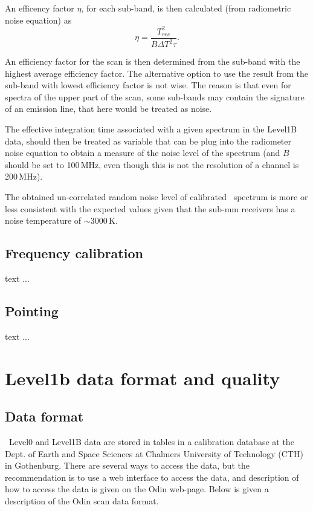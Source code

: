 An efficency factor \(\eta\), for each sub-band, is then calculated (from radiometric noise equation) as
\begin{equation}
\eta = \frac{T_{rec}^2}{B\Delta T^{2}\tau}.
\end{equation}

An efficiency factor for the scan is then determined from the sub-band
with the highest average efficiency factor. The alternative option
to use the result from the sub-band with lowest efficiency factor
is not wise. The reason is that even for spectra of the upper part
of the scan, some sub-bands may contain the signature of an emission 
line, that here would be treated as noise.

The effective integration time associated with a given spectrum
in the Level1B data, should then be treated as 
variable that can be plug into the radiometer noise equation
to obtain a measure of the noise level of the spectrum
(and \(B\) should be set to 100\,MHz, even though this is not
the resolution of a channel is 200\,MHz).

The obtained un-correlated random noise level of calibrated \smr\
spectrum is more or less consistent with the expected values
given that the sub-mm receivers has a noise temperature
of \(\sim\)3000\,K.	    


\section{Frequency calibration}

text ...


\section{Pointing}

text ...


\chapter{Level1b data format and quality}



\section{Data format}

\smr\ Level0 and Level1B data are stored in tables
in a calibration database at the Dept. of Earth and Space
Sciences at Chalmers University of Technology (CTH) in Gothenburg.
There are several ways to access the data, but the recommendation is to use a web 
interface to access the data, and description of how to access the data
is given on the Odin web-page. Below is given a description of the
Odin scan data format.


